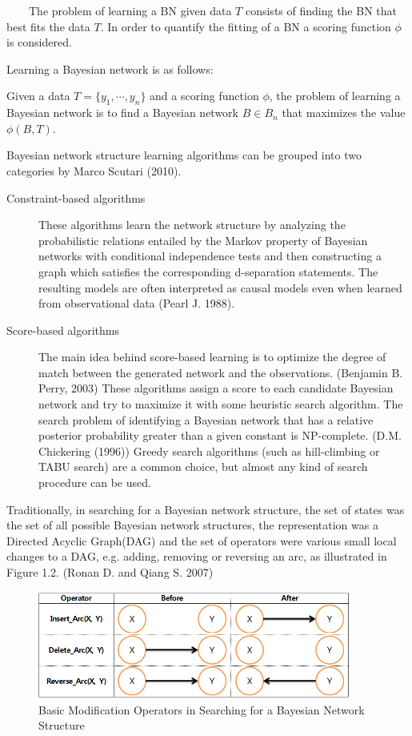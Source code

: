 ~~~~The problem of learning a BN given data $T$ consists of finding the BN that best fits the data $T$. In order to quantify the fitting of a BN a scoring function $\phi$ is considered.

Learning a Bayesian network is as follows:

Given a data $T = \{y_{1}, \cdots, y_{n}\}$ and a scoring function $\phi$, the problem of learning a Bayesian network is to find a Bayesian network $B \in B_{n}$ that maximizes the value $\phi(B, T)$.

Bayesian network structure learning algorithms can be grouped into two categories by Marco Scutari (2010).

\begin{description}

	\item[Constraint-based algorithms] These algorithms learn the network structure by analyzing the probabilistic relations entailed by the Markov property of Bayesian networks with conditional independence tests and then constructing a graph which satisfies the corresponding d-separation statements. The resulting models are often interpreted as causal models even when learned from observational data (Pearl J. 1988).
	
	\item[Score-based algorithms] The main idea behind score-based learning is to optimize the degree of match between the generated network and the observations. (Benjamin B. Perry, 2003) These algorithms assign a score to each candidate Bayesian network and try to maximize it with some heuristic search algorithm. The search problem of identifying a Bayesian network that has a relative posterior probability greater than a given constant is NP-complete. (D.M. Chickering (1996)) Greedy search algorithms (such as hill-climbing or TABU search) are a common choice, but almost any kind of search procedure can be used.
\end{description}

Traditionally, in searching for a Bayesian network structure, the set of states was the set of all possible Bayesian network structures, the representation was a Directed Acyclic Graph(DAG) and the set of operators were various small local changes to a DAG, e.g. adding, removing or reversing an arc, as illustrated in Figure 1.2. (Ronan D. and Qiang S. 2007)

\begin{figure}[!h]
	\centering
		\includegraphics[height=100pt]{DAG_Operators}
		\caption{Basic Modification Operators in Searching for a Bayesian Network Structure}
\end{figure}	
